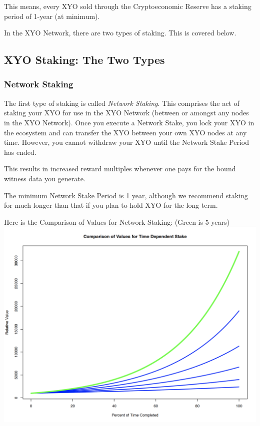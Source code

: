 \documentclass{article}
\begin{document}
This means, every XYO sold through the Cryptoeconomic Reserve has a staking period of 1-year (at minimum).

In the XYO Network, there are two types of staking. This is covered below. 

\subsection{XYO Staking: The Two Types}

\subsubsection{Network Staking}

The first type of staking is called \textit{Network Staking}. This comprises the act of staking your XYO for use in the XYO Network (between or amongst any nodes in the XYO Network). Once you execute a Network Stake, you lock your XYO in the ecosystem and can transfer the XYO between your own XYO nodes at any time. However, you cannot withdraw your XYO until the Network Stake Period has ended. 

This results in increased reward multiples whenever one pays for the bound witness data you generate. 

The minimum Network Stake Period is 1 year, although we recommend staking for much longer than that if you plan to hold XYO for the long-term.

Here is the Comparison of Values for Network Staking: (Green is 5 years)\\


\includegraphics[width=\textwidth]{staking-time}
\end{document}
